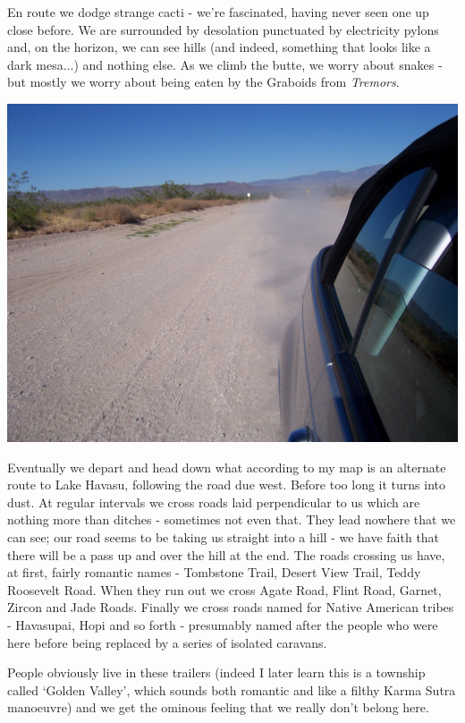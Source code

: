 \documentclass[a5paper,titlepage,11pt,draft]{book}
\begin{document}
En route we dodge strange cacti - we're fascinated, having never seen one up close before.  We are surrounded by desolation punctuated by electricity pylons and, on the horizon, we can see hills (and indeed, something that looks like a dark mesa...) and nothing else.  As we climb the butte, we worry about snakes - but mostly we worry about being eaten by the Graboids from \emph{Tremors}.

\begin{center}\includegraphics[width=\textwidth]{gfx/100_1531}\end{center}

Eventually we depart and head down what according to my map is an alternate route to Lake Havasu, following the road due west.  Before too long it turns into dust.  At regular intervals we cross roads laid perpendicular to us which are nothing more than ditches - sometimes not even that.  They lead nowhere that we can see; our road seems to be taking us straight into a hill - we have faith that there will be a pass up and over the hill at the end.  The roads crossing us have, at first, fairly romantic names - Tombstone Trail, Desert View Trail, Teddy Roosevelt Road.  When they run out we cross Agate Road, Flint Road, Garnet, Zircon and Jade Roads.  Finally we cross roads named for Native American tribes - Havasupai, Hopi and so forth - presumably named after the people who were here before being replaced by a series of isolated caravans.

People obviously live in these trailers (indeed I later learn this is a township called `Golden Valley', which sounds both romantic and like a filthy Karma Sutra manoeuvre) and we get the ominous feeling that we really don't belong here.
\end{document}
